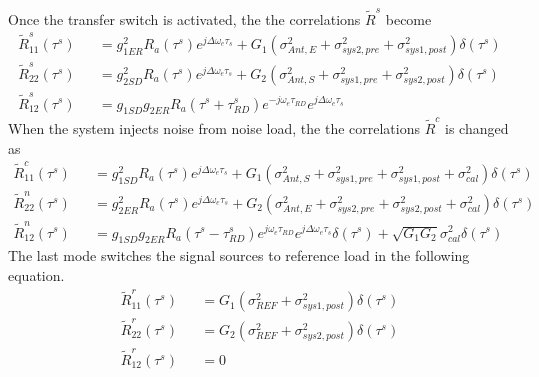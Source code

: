 \documentclass[draftcls,onecolumn]{IEEEtran}  %
\begin{document}
Once the transfer switch is activated, the the correlations $\tilde{R}^s$ become
\begin{eqnarray}
\tilde{R}_{11}^s(\tau^s) &&= g^2_{1ER} R_a(\tau^s)e^{j\Delta\omega_e\tau_s}+
G_1(\sigma^2_{Ant,E}+\sigma^2_{sys2,pre} +\sigma^2_{sys1,post}) \delta(\tau^s)                                       
\label{Eq: R22_reduce_swap} \\
\tilde{R}_{22}^s(\tau^s) &&= g^2_{2SD} R_a(\tau^s)e^{j\Delta\omega_e\tau_s}+
G_2(\sigma^2_{Ant,S}+\sigma^2_{sys1,pre} +\sigma^2_{sys2,post}) \delta(\tau^s)                                      
\label{Eq: R11_reduce_swap} \\
	\tilde{R}_{12}^s(\tau^s) &&= g_{1SD} g_{2ER} R_a(\tau^s+\tau^s_{RD})e^{-j\omega_e \tau_{RD}} e^{j\Delta\omega_e\tau_s}  
\label{Eq: R12_reduce_swap}
\end{eqnarray}
When the system injects noise from noise load, the the correlations $\tilde{R}^c$ is changed as
\begin{eqnarray}
	\tilde{R}_{11}^c(\tau^s) &&= g^2_{1SD} R_a(\tau^s)e^{j\Delta\omega_e\tau_s}+
G_1(\sigma^2_{Ant,S}+\sigma^2_{sys1,pre} +\sigma^2_{sys1,post}+\sigma^2_{cal}) \delta(\tau^s)                                      
\label{Eq: R11_reduce_cal} \\
	\tilde{R}_{22}^n(\tau^s) &&= g^2_{2ER} R_a(\tau^s)e^{j\Delta\omega_e\tau_s}+
G_2(\sigma^2_{Ant,E}+\sigma^2_{sys2,pre} +\sigma^2_{sys2,post}+\sigma^2_{cal}) \delta(\tau^s)                                       
\label{Eq: R22_reduce_cal} \\
	\tilde{R}_{12}^n(\tau^s) &&= g_{1SD} g_{2ER} R_a(\tau^s-\tau^s_{RD})e^{j\omega_e \tau_{RD}} e^{j\Delta\omega_e\tau_s}\delta(\tau^s)+
    \sqrt{G_1 G_2}\sigma^2_{cal}\delta(\tau^s)  
\label{Eq: R12_reduce_cal}
\end{eqnarray}The last mode switches the signal sources to reference load in the following equation.
\begin{eqnarray}
	\tilde{R}_{11}^r(\tau^s) &&= G_1(\sigma^2_{REF}+\sigma^2_{sys1,post}) \delta(\tau^s)                                      
\label{Eq: R11_reduce_ref} \\
	\tilde{R}_{22}^r(\tau^s) &&= G_2(\sigma^2_{REF}+\sigma^2_{sys2,post}) \delta(\tau^s)                                
\label{Eq: R22_reduce_ref} \\
	\tilde{R}_{12}^r(\tau^s) &&= 0 
\label{Eq: R12_reduce_ref}
\end{eqnarray}
\end{document}
